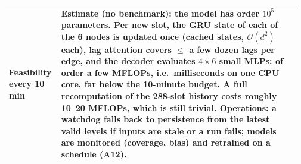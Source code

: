 \begin{longtable}{@{}p{0.17\linewidth}p{0.80\linewidth}@{}}
\textbf{Feasibility every 10 min} & Estimate (no benchmark): the model has order $10^{5}$ parameters. Per new slot, the GRU state of each of the 6 nodes is updated once (cached states, $\mathcal O(d^2)$ each), lag attention covers $\le$ a few dozen lags per edge, and the decoder evaluates $4\times6$ small MLPs: of order a few MFLOPs, i.e.\ milliseconds on one CPU core, far below the 10-minute budget. A full recomputation of the 288-slot history costs roughly 10--20 MFLOPs, which is still trivial. Operations: a watchdog falls back to persistence from the latest valid levels if inputs are stale or a run fails; models are monitored (coverage, bias) and retrained on a schedule (A12).\\
\bottomrule
\end{longtable}
\normalsize

